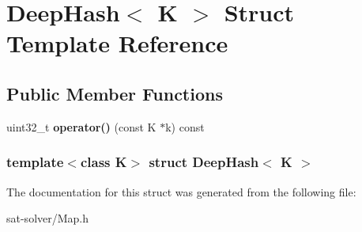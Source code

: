 \hypertarget{structDeepHash}{\section{\-Deep\-Hash$<$ \-K $>$ \-Struct \-Template \-Reference}
\label{structDeepHash}
}
\subsection*{\-Public \-Member \-Functions}
\begin{DoxyCompactItemize}
\item 
\hypertarget{structDeepHash_a014f693e6a729f516fb1dfe4fd67d538}{uint32\-\_\-t {\bfseries operator()} (const \-K $\ast$k) const }\label{structDeepHash_a014f693e6a729f516fb1dfe4fd67d538}

\end{DoxyCompactItemize}
\subsubsection*{template$<$class K$>$ struct Deep\-Hash$<$ K $>$}



\-The documentation for this struct was generated from the following file\-:\begin{DoxyCompactItemize}
\item 
sat-\/solver/\-Map.\-h\end{DoxyCompactItemize}

